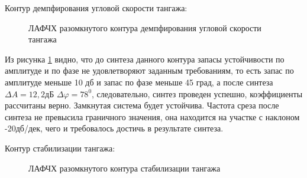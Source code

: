 \begin{center}
    Контур демпфирования угловой скорости тангажа:
\end{center}

\begin{figure}[H]
    \caption{ЛАФЧХ разомкнутого контура демпфирования угловой скорости тангажа}
    \label{fig:Угловая скорость тангажа раз qKR}
\end{figure}

Из рисунка \ref{fig:Угловая скорость тангажа раз qKR} видно, что до синтеза данного контура запасы устойчивости по амплитуде и по фазе не удовлетворяют заданным требованиям, то есть запас по амплитуде меньше 10 дб и запас по фазе меньше 45 град, а после синтеза $\Delta A = 12,2 $дБ $\Delta \varphi = 78^0$, следовательно, синтез проведен успешно, коэффициенты рассчитаны верно. Замкнутая система будет устойчива. Частота среза после синтеза не превысила граничного значения, она находится на участке с наклоном -20дб/дек, чего и требовалось достичь в результате синтеза.  

\begin{center}
    Контур стабилизации тангажа:
\end{center}

\begin{figure}[H]
    \caption{ЛАФЧХ разомкнутого контура стабилизации тангажа}
    \label{fig:Тангаж раз qKR}
\end{figure}

